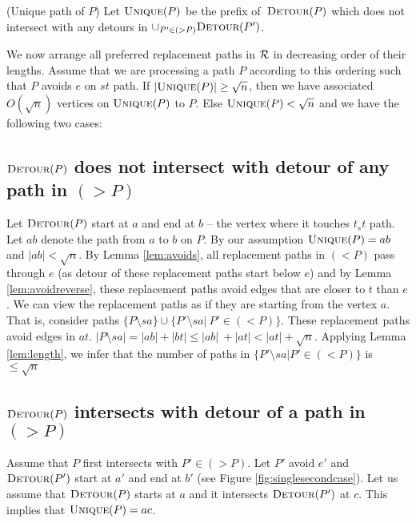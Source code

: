 \begin{definition}
\label{def:unique}
(Unique path of $P$) Let $\textsc{Unique}(P)$ be the prefix of\ $\textsc{Detour}(P)$ which does not intersect with any detours in $\cup_{P' \in (>P)} \textsc{Detour}(P')$.
\end{definition}
We now arrange all  preferred replacement paths in $\mathcal{R}$ in decreasing order of their lengths. Assume that we are processing a path $P$ according to this ordering such that $P$ avoids $e$ on $st$ path. If $|\textsc{Unique}(P)| \ge \sqrt n$, then we have associated $O(\sqrt n)$ vertices on $\textsc{Unique}(P)$ to $P$. Else $\textsc{Unique}(P) < \sqrt{n}$ and we have the following two cases:

\iflong
\else
\vspace{-2mm}
\fi
\subsection{   $\textsc{Detour}(P)$ does not intersect with  detour of any path in $(>P)$}
\label{subsec:singlecaseone}
\iflong

\fi
    Let $\textsc{Detour}(P)$ start at $a$ and end at $b$ -- the vertex where it touches
    $t_st$ path. Let $ab$ denote the
path from $a$ to $b$ on $P$. By our assumption $\textsc{Unique}(P) = ab$ and $|ab| < \sqrt n$.
    By Lemma \ref{lem:avoids}, all  replacement paths in $(<P)$ pass through $e$
    (as detour of these replacement paths start below $e$) and by Lemma \ref{lem:avoidreverse},
    these replacement paths avoid edges that are closer to $t$ than $e$. We can view the
    replacement paths as if they are starting from the vertex $a$. That is, consider  paths
    $\{P\setminus sa\} \cup \{ P'\setminus sa | \ P' \in (<P)\}$. These replacement
    paths avoid edges in $at$.   $|P \setminus sa| = |ab| +  |bt| \le |ab|\ + |at| < |at| + \sqrt n$.
    Applying Lemma \ref{lem:length}, we infer that the number of paths in $\{ P'\setminus
sa | P' \in (<P)\}$ is $\le \sqrt n$

\iflong
\else
\vspace{-2mm}
\fi
\subsection{$\textsc{Detour}(P)$ intersects with  detour of a path in $(>P)$}
\label{subsec:singlecasetwo}
Assume that $P$ first intersects with $P' \in (>P)$. Let $P'$ avoid $e'$ and $\textsc{Detour}(P')$ start at $a'$ and end at $b'$ (see Figure \ref{fig:singlesecondcase}). Let us assume that $\textsc{Detour}(P)$ starts at $a$ and it intersects $\textsc{Detour}(P')$ at $c$. This implies that $\textsc{Unique}(P) = ac$.

